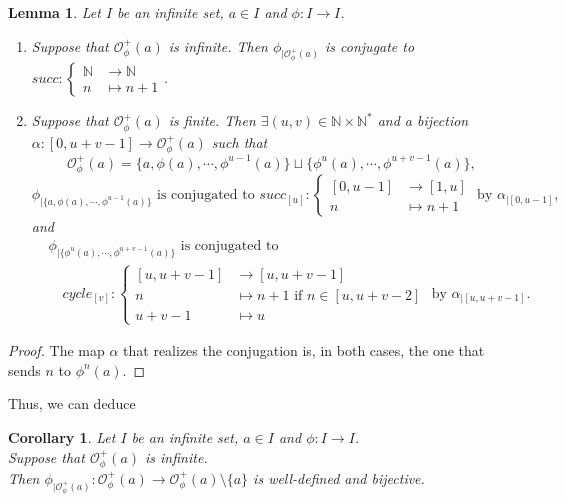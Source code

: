 \documentclass[a4paper,11pt]{article}
\theoremstyle{plain}
\newtheorem{corollary}{Corollary}[section]
\newtheorem{lemma}{Lemma}[section]
\theoremstyle{definition}
\theoremstyle{remark}
\begin{document}
\begin{lemma}
Let $I$ be an infinite set, $a \in I$ and $\phi : I \to I$.
\begin{enumerate}
\item Suppose that $\mathcal{O}^{+}_\phi(a)$ is infinite. Then $\phi_{|\mathcal{O}^{+}_\phi(a)}$ is conjugate to $succ : \begin{cases} \mathbb{N} &\to \mathbb{N} \\ n &\mapsto n+1 \end{cases}$.
\item Suppose that $\mathcal{O}^{+}_\phi(a)$ is finite. Then ${\exists (u,v) \in \mathbb{N}\times \mathbb{N}^*}$ and a bijection ${\alpha :  [0,u+v-1] \to \mathcal{O}^{+}_\phi(a)}$ such that 
\[ {\mathcal{O}^{+}_\phi(a) = \{a,\phi(a),\cdots,\phi^{u-1}(a)\} \sqcup \{\phi^u(a), \cdots, \phi^{u+v-1}(a)\}}, \]
\[ \phi_ {| \{a,\phi(a),\cdots,\phi^{u-1}(a)\}} \text{ is conjugated to } succ_{[u]} : \begin{cases} [0,u-1] &\to [1,u] \\ n &\mapsto n+1 \end{cases} \text{ by } \alpha_{|[0,u-1]}, \]
and 
\begin{align*}
&\phi_{| \{\phi^u(a),\cdots,\phi^{u+v-1}(a)\}} \text{ is conjugated to } \\
&\quad cycle_{[v]} :  \begin{cases} [u,u+v-1] &\to [u,u+v-1] \\ n &\mapsto n+1 \text { if } n \in [u,u+v-2] \\ u+v-1 &\mapsto u \end{cases} \text{ by } \alpha_{|[u,u+v-1]}. 
\end{align*}
\end{enumerate}
\end{lemma}

\begin{proof}
The map $\alpha$ that realizes the conjugation is, in both cases, the one that sends $n$ to $\phi^n(a)$.
\end{proof}

Thus, we can deduce

\begin{corollary}
\label{corOrbCofMapBijec}
Let $I$ be an infinite set, $a \in I$ and $\phi : I \to I$. \\
Suppose that $\mathcal{O}^{+}_\phi(a)$ is infinite. \\
Then $\phi_{|\mathcal{O}^{+}_\phi(a)} : \mathcal{O}^{+}_\phi(a) \to \mathcal{O}^{+}_\phi(a) \setminus \{a\}$ is well-defined and bijective.
\end{corollary}
\end{document}
